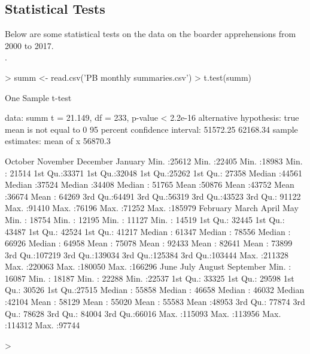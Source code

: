\documentclass{article}
\begin{document}
\subsection{Statistical Tests}
\begin{center}
Below are some statistical tests on the data on the boarder apprehensions from 2000 to 2017.\\
.\\

\end{center}
\begin{Schunk}
\begin{Sinput}
> summ <- read.csv('PB monthly summaries.csv')
> t.test(summ)
\end{Sinput}
\begin{Soutput}
	One Sample t-test

data:  summ
t = 21.149, df = 233, p-value < 2.2e-16
alternative hypothesis: true mean is not equal to 0
95 percent confidence interval:
 51572.25 62168.34
sample estimates:
mean of x 
  56870.3 
\end{Soutput}
\begin{Soutput}
    October         November        December        January      
 Min.   :25612   Min.   :22405   Min.   :18983   Min.   : 21514  
 1st Qu.:33371   1st Qu.:32048   1st Qu.:25262   1st Qu.: 27358  
 Median :44561   Median :37524   Median :34408   Median : 51765  
 Mean   :50876   Mean   :43752   Mean   :36674   Mean   : 64269  
 3rd Qu.:64491   3rd Qu.:56319   3rd Qu.:43523   3rd Qu.: 91122  
 Max.   :91410   Max.   :76196   Max.   :71252   Max.   :185979  
    February          March            April             May        
 Min.   : 18754   Min.   : 12195   Min.   : 11127   Min.   : 14519  
 1st Qu.: 32445   1st Qu.: 43487   1st Qu.: 42524   1st Qu.: 41217  
 Median : 61347   Median : 78556   Median : 66926   Median : 64958  
 Mean   : 75078   Mean   : 92433   Mean   : 82641   Mean   : 73899  
 3rd Qu.:107219   3rd Qu.:139034   3rd Qu.:125384   3rd Qu.:103444  
 Max.   :211328   Max.   :220063   Max.   :180050   Max.   :166296  
      June             July            August         September    
 Min.   : 16087   Min.   : 18187   Min.   : 22288   Min.   :22537  
 1st Qu.: 33325   1st Qu.: 29598   1st Qu.: 30526   1st Qu.:27515  
 Median : 55858   Median : 46658   Median : 46032   Median :42104  
 Mean   : 58129   Mean   : 55020   Mean   : 55583   Mean   :48953  
 3rd Qu.: 77874   3rd Qu.: 78628   3rd Qu.: 84004   3rd Qu.:66016  
 Max.   :115093   Max.   :113956   Max.   :114312   Max.   :97744  
\end{Soutput}
\begin{Sinput}
> 
\end{Sinput}
\end{Schunk}
\end{document}
